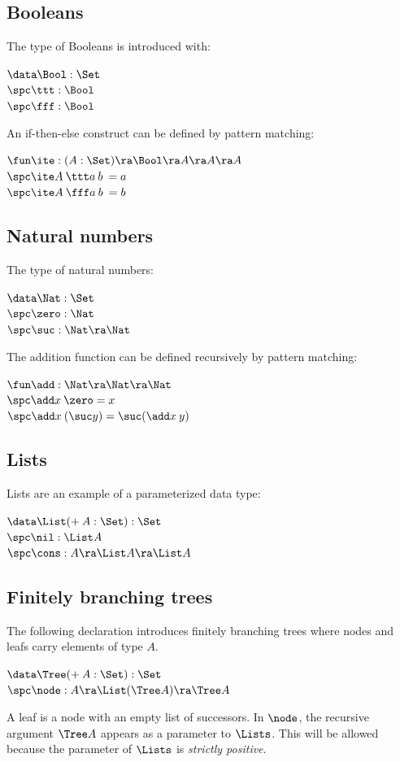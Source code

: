 \subsection{Booleans}

The type of Booleans is introduced with:
\begin{bsp}
$\data \Bool : \Set$  \\
$\spc \ttt : \Bool $\\
$\spc \fff : \Bool $
\end{bsp}
\noindent An if-then-else construct can be defined by pattern matching:
\begin{bsp}
$\fun \ite : (A : \Set ) \ra \Bool \ra A \ra A \ra A$\\
$\spc \ite A\: \ttt a\: b\: = a$\\
$\spc \ite A\: \fff a\: b\: = b$
\end{bsp}
\subsection{Natural numbers}
The type of natural numbers:
\begin{bsp}
$\data \Nat : \Set$ \\
$\spc \zero : \Nat $\\
$\spc \suc : \Nat \ra \Nat$
\end{bsp}

\noindent The addition function can be defined recursively by pattern matching:
\begin{bsp}
$\fun \add : \Nat \ra \Nat \ra \Nat$\\
$\spc \add x \: \zero = x $\\
$\spc \add x \: (\suc y) = \suc (\add x \: y)  $
\end{bsp}
\subsection{Lists}
Lists are an example of a parameterized data type:
\begin{bsp}
$\data \List ( + \: A : \Set ) : \Set $ \\
$ \spc \nil : \List A  $\\
$ \spc \cons : A \ra \List A \ra \List A $
\end{bsp}
\subsection{Finitely branching trees}
\label{tre}
The following declaration introduces finitely branching trees where nodes and leafs carry elements of type $A$.
\begin{bsp}
$\data \Tree ( + \: A : \Set ) : \Set $ \\
$ \spc \node : A \ra \List (\Tree A ) \ra \Tree A  $
\end{bsp}
A leaf is a node with an empty list of successors. 
In $\node$, the recursive argument $\Tree A$ appears as a parameter to $\Lists$.
This will be allowed because the parameter of $\Lists$ is \emph{strictly positive}.
